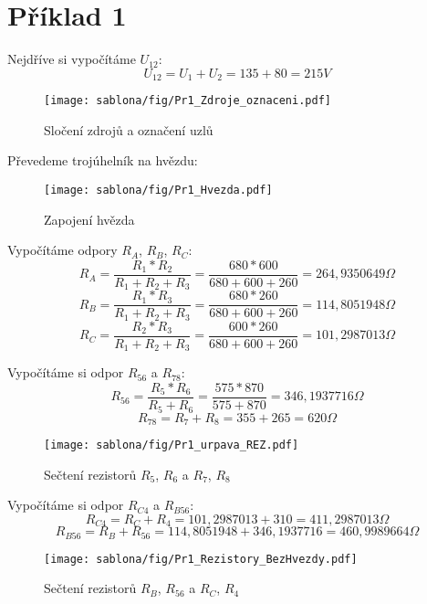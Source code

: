 \section{Příklad 1}

Nejdříve si vypočítáme $U_{12}$:
$$U_{12} = U_1 + U_2 = 135 + 80 = 215 V$$

    \begin{figure}[htb]
    \centering
    \texttt{[image: sablona/fig/Pr1\_Zdroje\_oznaceni.pdf]} \\
    \caption{Sločení zdrojů a označení uzlů}
    \end{figure}

\newpage

Převedeme trojúhelník na hvězdu: 
    \begin{figure}[htb]
    \centering
    \texttt{[image: sablona/fig/Pr1\_Hvezda.pdf]} \\
    \caption{Zapojení hvězda}
    \end{figure}

Vypočítáme odpory $R_A$, $R_B$, $R_C$:
$$R_A = \frac{R_1*R_2}{R_1 + R_2 + R_3} = \frac{680*600}{680+600+260} = 264,9350649\Omega$$
$$R_B = \frac{R_1*R_3}{R_1 + R_2 + R_3} = \frac{680*260}{680+600+260} = 114,8051948\Omega$$
$$R_C = \frac{R_2*R_3}{R_1 + R_2 + R_3} = \frac{600*260}{680+600+260} = 101,2987013\Omega$$
\newline

Vypočítáme si odpor $R_{56}$ a $R_{78}$:
$$R_{56} = \frac{R_5*R_6}{R_5+R_6} = \frac{575*870}{575+870} = 346,1937716\Omega$$
$$R_{78} = R_7 + R_8 = 355 + 265 = 620\Omega$$
    \begin{figure}[htb]
    \centering
    \texttt{[image: sablona/fig/Pr1\_urpava\_REZ.pdf]} \\
    \caption{Sečtení rezistorů $R_5$, $R_6$ a $R_7$, $R_8$}
    \end{figure}

\newpage

Vypočítáme si odpor $R_{C4}$ a $R_{B56}$:
$$R_{C4} = R_C + R_4 = 101,2987013 + 310 = 411,2987013\Omega$$
$$R_{B56} = R_B + R_{56} = 114,8051948 + 346,1937716 = 460,9989664\Omega$$
    \begin{figure}[htb]
    \centering
    \texttt{[image: sablona/fig/Pr1\_Rezistory\_BezHvezdy.pdf]} \\
    \caption{Sečtení rezistorů $R_B$, $R_{56}$ a $R_C$, $R_4$}
    \end{figure}

